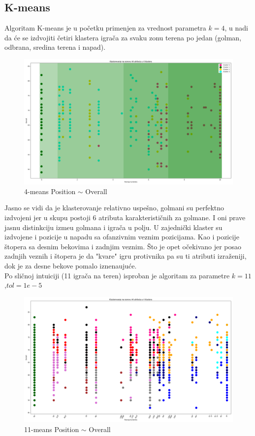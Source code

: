 \documentclass[a4paper, 11pt]{article}
\begin{document}
\subsection{K-means}
Algoritam K-means je u po\v{c}etku primenjen za vrednost parametra $k = 4$, u nadi
da \'{c}e se izdvojiti \v{c}etiri klastera igra\v{c}a za svaku zonu terena po jedan
(golman, odbrana, sredina terena i napad).

\begin{figure}[h]
\centering
\graphicspath{{../}}
\includegraphics[scale=0.15]{position_clustering.png}
\caption{4-means Position $\sim$ Overall}
\end{figure}


Jasno se vidi da je klasterovanje relativno uspe\v{s}no, 
golmani su perfektno izdvojeni jer u skupu postoji 6 atributa 
karakteristi\v{c}nih za golmane. I oni prave jasnu distinkciju
izme\dj{}u golmana i igra\v{c}a u polju. U zajedni\v{c}ki
klaster su izdvojene i pozicije u napadu sa ofanzivnim veznim
pozicijama. Kao i pozicije \v{s}topera sa desnim bekovima i zadnjim veznim.
\v{S}to je opet o\v{c}ekivano jer posao zadnjih veznih i \v{s}topera je 
da "kvare"  igru protivnika pa su ti atributi izra\v{z}eniji, dok je za desne
bekove pomalo iznena\dj{}uju\'{c}e.\\

Po sli\v{c}noj intuiciji (11 igra\v{c}a na teren) isproban je algoritam za parametre
$k=11 $ ,$ tol=1e-5$

\begin{figure}[h]
\centering
\graphicspath{{../}}
\includegraphics[scale=0.15]{kmeans_11.png}
\caption{11-means Position $\sim$ Overall}
\end{figure}
\end{document}
